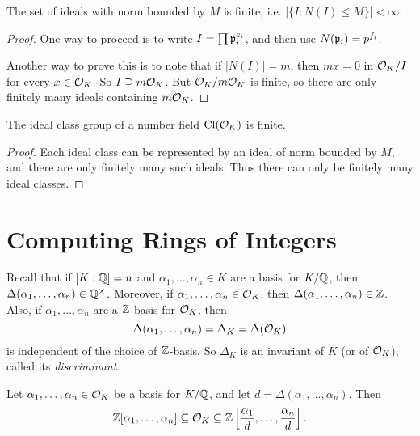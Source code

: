 \begin{lemma}
  The set of ideals with norm bounded by $M$
  is finite, i.e. $|\{I : N(I) \le M\}| < \infty$.
\end{lemma}

\begin{proof}
  One way to proceed is to write $I = \prod \mathfrak{p}_i^{e_i}$,
  and then use $N(\mathfrak{p}_i) = p^{f_i}$.

  Another way to prove this is to note that
  if $|N(I)| = m$, then $mx = 0$ in
  $\mathcal{O}_K / I$ for every $x \in \mathcal{O}_K$. So
  $I \supseteq m \mathcal{O}_K$. But
  $\mathcal{O}_K / m \mathcal{O}_K$ is finite, so there are only
  finitely many ideals containing $m \mathcal{O}_K$.
\end{proof}

\begin{corollary}
  The ideal class group of a number field $\operatorname{Cl}(\mathcal{O}_K)$ is finite.
\end{corollary}

\begin{proof}
  Each ideal class can be represented by an ideal of
  norm bounded by $M$, and there are only
  finitely many such ideals. Thus there can only be
  finitely many ideal classes.
\end{proof}

\section{Computing Rings of Integers}

\begin{remark}
  Recall that if $[K : \mathbb{Q}] = n$ and
  $\alpha_1, \dots, \alpha_n \in K$ are a basis for
  $K / \mathbb{Q}$, then
  $\Delta(\alpha_1, \dots, \alpha_n) \in \mathbb{Q}^\times$.
  Moreover, if $\alpha_1, \dots, \alpha_n \in \mathcal{O}_K$,
  then $\Delta(\alpha_1, \dots, \alpha_n) \in \mathbb{Z}$.
  Also, if $\alpha_1, \dots, \alpha_n$ are a $\mathbb{Z}$-basis
  for $\mathcal{O}_K$, then
  \[
    \Delta(\alpha_1, \dots, \alpha_n) = \Delta_K = \Delta(\mathcal{O}_K)
  \]
  is independent of the choice of $\mathbb{Z}$-basis. So
  $\Delta_K$ is an invariant of $K$ (or of $\mathcal{O}_K$),
  called its \emph{discriminant}.
\end{remark}

\begin{prop}
  Let $\alpha_1, \dots, \alpha_n \in \mathcal{O}_K$ be a basis
  for $K / \mathbb{Q}$, and let
  $d = \Delta(\alpha_1, \dots, \alpha_n)$. Then
  \[
    \mathbb{Z}[\alpha_1, \dots, \alpha_n]
    \subseteq \mathcal{O}_K \subseteq
    \mathbb{Z}\left[\frac{\alpha_1}{d}, \dots, \frac{\alpha_n}{d}\right].
  \]
\end{prop}

